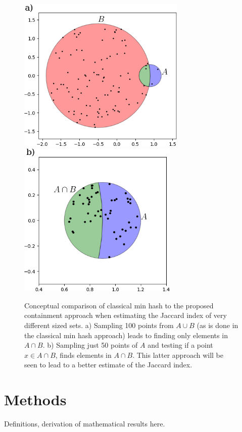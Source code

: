 \documentclass[11pt]{amsart}
\theoremstyle{remark}
\numberwithin{equation}{section}
\newcommand{\ClassicalConceptual}{\protect }
\newcommand{\ContainmentConceptual}{\protect }
\begin{document}
\begin{figure}[!h]%
\begin{center}
\includegraphics[width=3.15in,trim={0 0 0 0in},clip]{Figs/ClassicalConceptual.png}%
\hspace{1ex}
\includegraphics[width=3.0in,trim={0 0 0 0in},clip]{Figs/ContainmentConceptual.png}
\end{center}
\caption{Conceptual comparison of classical min hash to the proposed containment approach when estimating the Jaccard index of very different sized sets. a) Sampling 100 points from $A\cup B$ (as is done in the classical min hash approach) leads to finding only \ClassicalConceptual elements in $A\cap B$. b) Sampling just 50 points of $A$ and testing if a point $x\in A\cap B$, finds \ContainmentConceptual elements in $A\cap B$. This latter approach will be seen to lead to a better estimate of the Jaccard index. }
\label{fig:Conceptual}%
\end{figure}





\section{Methods}
Definitions, derivation of mathematical results here.
\end{document}
